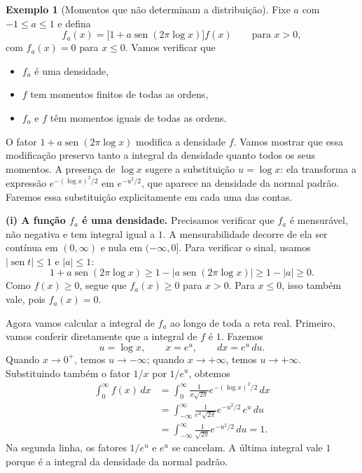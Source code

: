 \documentclass[12pt,portuguese]{article}
\theoremstyle{definition}
\newtheorem{example}[example]{Exemplo}
\theoremstyle{plainexercise}
\theoremstyle{starredexercise}
\theoremstyle{definition}
\renewcommand{\sin}{\operatorname{sen}}
\begin{document}
\begin{example}[Momentos que não determinam a distribuição]\label{ex:lognormal-momentos}
Fixe $a$ com $-1 \leqslant a \leqslant 1$ e defina
\[
f_a(x) = \bigl[1 + a\sin(2\pi \log x)\bigr] f(x)
\qquad \text{para } x > 0,
\]
com $f_a(x) = 0$ para $x \leqslant 0$. Vamos verificar que
\begin{itemize}
\item[(i)] $f_a$ é uma densidade,
\item[(ii)] $f$ tem momentos finitos de todas as ordens,
\item[(iii)] $f_a$ e $f$ têm momentos iguais de todas as ordens.
\end{itemize}	
O fator $1 + a\sin(2\pi\log x)$ modifica a densidade $f$. Vamos mostrar
que essa modificação preserva tanto a integral da densidade quanto todos
os seus momentos. A presença de $\log x$ sugere a substituição $u=\log x$:
ela transforma a expressão $e^{-(\log x)^2/2}$ em $e^{-u^2/2}$, que aparece
na densidade da normal padrão. Faremos essa substituição explicitamente
em cada uma das contas.

\smallskip
\noindent\textbf{(i) A função $f_a$ é uma densidade.}
Precisamos verificar que $f_a$ é mensurável, não negativa e tem integral
igual a $1$. A mensurabilidade decorre de ela ser contínua em $(0,\infty)$
e nula em $(-\infty,0]$. Para verificar o sinal, usamos $|\sin t|\leqslant 1$
e $|a|\leqslant 1$:
\[
1+a\sin(2\pi\log x)
\geqslant 1-|a\sin(2\pi\log x)|
\geqslant 1-|a|
\geqslant 0.
\]
Como $f(x)\geqslant 0$, segue que $f_a(x)\geqslant 0$ para $x>0$.
Para $x\leqslant 0$, isso também vale, pois $f_a(x)=0$.

Agora vamos calcular a integral de $f_a$ ao longo de toda a reta real. 
Primeiro, vamos conferir diretamente que a integral
de $f$ é $1$. Fazemos
\[
u=\log x,\qquad x=e^u,\qquad dx=e^u\,du.
\]
Quando $x\to 0^+$, temos $u\to-\infty$; quando $x\to+\infty$, temos
$u\to+\infty$. Substituindo também o fator $1/x$ por $1/e^u$, obtemos
\begin{align*}
\int_0^\infty f(x)\,dx
&=\int_0^\infty \frac{1}{x\sqrt{2\pi}}
   e^{-(\log x)^2/2}\,dx
\\[0.3cm]
&=\int_{-\infty}^{\infty}\frac{1}{e^u\sqrt{2\pi}}
   e^{-u^2/2}\,e^u\,du
\\[0.3cm]
&=\int_{-\infty}^{\infty}\frac{1}{\sqrt{2\pi}}e^{-u^2/2}\,du
=1.
\end{align*}
Na segunda linha, os fatores $1/e^u$ e $e^u$ se cancelam. A última
integral vale $1$ porque é a integral da densidade da normal padrão.


\end{example}
\end{document}
